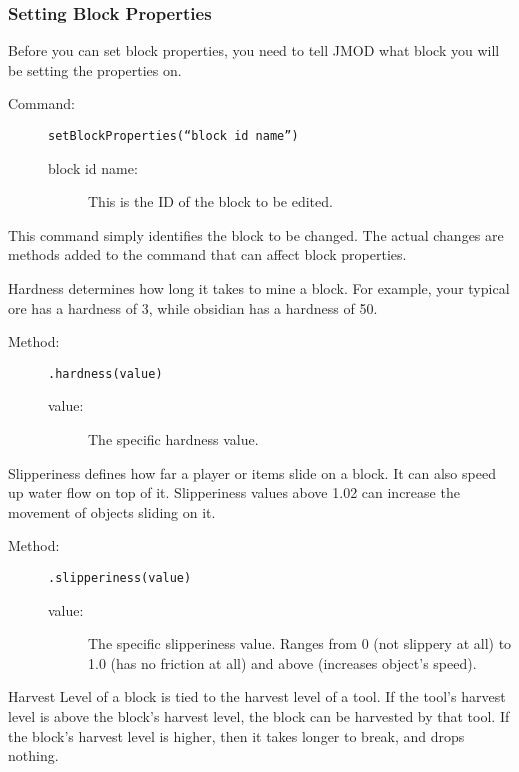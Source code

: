 \documentclass[letterpaper,titlepage,12pt]{article}
\begin{document}
\subsubsection{Setting Block Properties}

Before you can set block properties, you need to tell JMOD what block you will be setting the properties on.

\begin{description}
\item[Command:] \texttt{setBlockProperties(``block id name'')}
\begin{description}
\item [block id name:] This is the ID of the block to be edited.
\end{description}
\end{description}

This command simply identifies the block to be changed.  The actual changes are methods added to the command that can affect block properties.

Hardness determines how long it takes to mine a block.  For example, your typical ore has a hardness of 3, while obsidian has a hardness of 50.

\begin{description}
\item[Method:] \texttt{.hardness(value)}
\begin{description}
\item [value:] The specific hardness value.
\end{description}
\end{description}

Slipperiness defines how far a player or items slide on a block.  It can also speed up water flow on top of it.  Slipperiness values above 1.02 can increase the movement of objects sliding on it.

\begin{description}
\item[Method:] \texttt{.slipperiness(value)}
\begin{description}
\item [value:] The specific slipperiness value.  Ranges from 0 (not slippery at all) to 1.0 (has no friction at all) and above (increases object's speed).
\end{description}
\end{description}

Harvest Level of a block is tied to the harvest level of a tool.  If the tool's harvest level is above the block's harvest level, the block can be harvested by that tool.  If the block's harvest level is higher, then it takes longer to break, and drops nothing.
\end{document}
